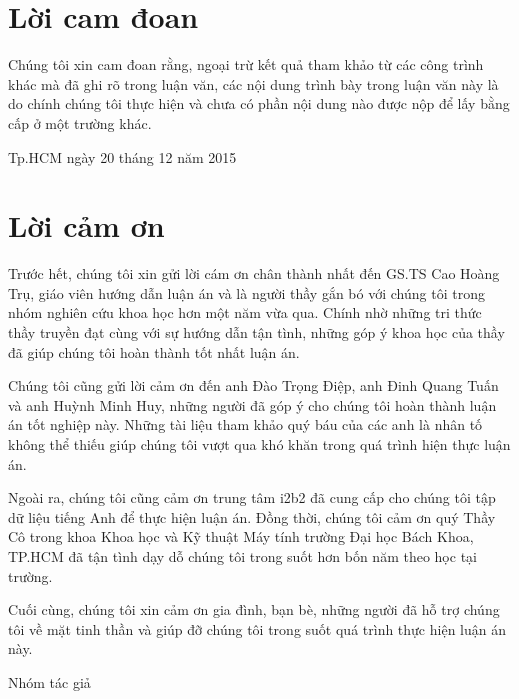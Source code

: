 \documentclass[12pt,a4paper]{report}
\begin{document}


\chapter*{Lời cam đoan}
Chúng tôi xin cam đoan rằng, ngoại trừ kết quả tham khảo từ các công trình khác mà đã ghi rõ trong luận văn, các nội dung trình bày trong luận văn này là do chính chúng tôi thực hiện và chưa có phần nội dung nào được nộp để lấy bằng cấp ở một trường khác.

\begin{flushright}
Tp.HCM ngày 20 tháng 12 năm 2015
\end{flushright}

\chapter*{Lời cảm ơn}
Trước hết, chúng tôi xin gửi lời cám ơn chân thành nhất đến GS.TS Cao Hoàng Trụ, giáo viên hướng dẫn luận án và là người thầy gắn bó với chúng tôi trong nhóm nghiên cứu khoa học hơn một năm vừa qua. Chính nhờ những tri thức thầy truyền đạt cùng với sự hướng dẫn tận tình, những góp ý khoa học của thầy đã giúp chúng tôi hoàn thành tốt nhất luận án.

Chúng tôi cũng gửi lời cảm ơn đến anh Đào Trọng Điệp, anh Đinh Quang Tuấn và anh Huỳnh Minh Huy, những người đã góp ý cho chúng tôi hoàn thành luận án tốt nghiệp này. Những tài liệu tham khảo quý báu của các anh là nhân tố không thể thiếu giúp chúng tôi vượt qua khó khăn trong quá trình hiện thực luận án.

Ngoài ra, chúng tôi cũng cảm ơn trung tâm i2b2 đã cung cấp cho chúng tôi tập dữ liệu tiếng Anh để thực hiện luận án. Đồng thời, chúng tôi cảm ơn quý Thầy Cô trong khoa Khoa học và Kỹ thuật Máy tính trường Đại học Bách Khoa, TP.HCM đã tận tình dạy dỗ chúng tôi trong suốt hơn bốn năm theo học tại trường.

Cuối cùng, chúng tôi xin cảm ơn gia đình, bạn bè, những người đã hỗ trợ chúng tôi về mặt tinh thần và giúp đỡ chúng tôi trong suốt quá trình thực hiện luận án này.

\begin{flushright}
Nhóm tác giả
\end{flushright}
\end{document}
